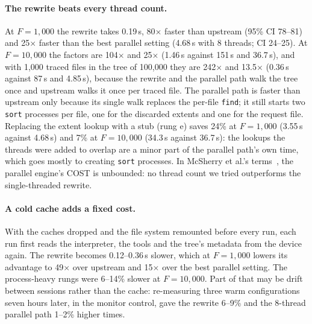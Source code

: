 \paragraph{The rewrite beats every thread count.} At $F = 1{,}000$ the rewrite takes
0.19\,s, 80$\times$ faster than upstream (95\% CI 78--81) and 25$\times$ faster than the
best parallel setting (4.68\,s with 8 threads; CI 24--25). At $F = 10{,}000$ the factors
are 104$\times$ and 25$\times$ (1.46\,s against 151\,s and 36.7\,s), and with 1{,}000
traced files in the tree of 100{,}000 they are 242$\times$ and 13.5$\times$ (0.36\,s
against 87\,s and 4.85\,s), because the rewrite and the parallel path walk the tree once
and upstream walks it once per traced file. The parallel path is
faster than upstream only because its single walk replaces the per-file \texttt{find};
it still starts two \texttt{sort} processes per file, one for the discarded extents and
one for the request file. Replacing the extent lookup with a stub (rung e) saves 24\% at
$F = 1{,}000$ (3.55\,s against 4.68\,s) and 7\% at $F = 10{,}000$ (34.3\,s against
36.7\,s): the lookups the threads were added to overlap are a minor part of the parallel
path's own time, which goes mostly to creating \texttt{sort} processes. In McSherry et
al.'s terms~\cite{mcsherry2015cost}, the parallel engine's COST is unbounded: no thread
count we tried outperforms the single-threaded rewrite.

\paragraph{A cold cache adds a fixed cost.} With the caches dropped and the file system
remounted before every run, each run first reads the interpreter, the tools and the
tree's metadata from the device again. The rewrite becomes 0.12--0.36\,s slower, which
at $F = 1{,}000$ lowers its advantage to 49$\times$ over upstream and 15$\times$ over the
best parallel setting. The process-heavy rungs were 6--14\% slower at $F = 10{,}000$.
Part of that may be drift between sessions rather than the cache: re-measuring three
warm configurations seven hours later, in the monitor control, gave the rewrite 6--9\%
and the 8-thread parallel path 1--2\% higher times.

